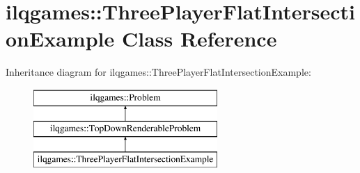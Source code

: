 \hypertarget{classilqgames_1_1_three_player_flat_intersection_example}{}\section{ilqgames\+:\+:Three\+Player\+Flat\+Intersection\+Example Class Reference}
\label{classilqgames_1_1_three_player_flat_intersection_example}
Inheritance diagram for ilqgames\+:\+:Three\+Player\+Flat\+Intersection\+Example\+:\begin{figure}[H]
\begin{center}
\leavevmode
\includegraphics[height=3.000000cm]{classilqgames_1_1_three_player_flat_intersection_example}
\end{center}
\end{figure}

